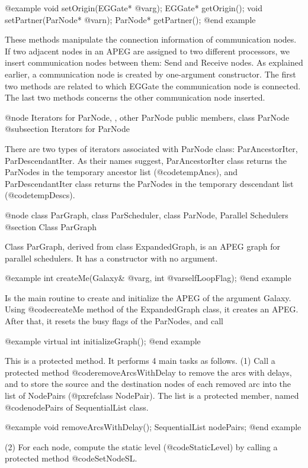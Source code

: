 @example
void setOrigin(EGGate* @var{g});
EGGate* getOrigin();
void setPartner(ParNode* @var{n});
ParNode* getPartner();
@end example

These methods manipulate the connection information of communication nodes.
If two adjacent nodes in an APEG are assigned to two different processors,
we insert communication nodes between them: Send and Receive nodes. As
explained earlier, a communication node is created by one-argument
constructor. The
first two methods are related to which EGGate the communication node is
connected. The last two methods concerns the other communication node
inserted.

@node Iterators for ParNode, , other ParNode public members, class ParNode
@subsection Iterators for ParNode

There are two types of iterators associated with ParNode class: 
ParAncestorIter, ParDescendantIter. As their names suggest, ParAncestorIter
class returns the ParNodes in the temporary ancestor list (@code{tempAncs}),
and ParDescendantIter class returns the ParNodes in the temporary
descendant list (@code{tempDescs}). 

@node class ParGraph, class ParScheduler, class ParNode, Parallel Schedulers
@section Class ParGraph

Class ParGraph, derived from class ExpandedGraph, is an APEG graph for
parallel schedulers. It has a constructor with no argument. 

@example
int createMe(Galaxy& @var{g}, int @var{selfLoopFlag});
@end example

Is the main routine to create and initialize the APEG of the
argument Galaxy. Using @code{createMe} method of the ExpandedGraph
class, it creates an APEG. After that, it resets the busy flags of
the ParNodes, and call

@example
virtual int initializeGraph();
@end example

This is a protected method. It performs 4 main tasks as follows.
(1) Call a protected method @code{removeArcsWithDelay} to remove 
the arcs with delays, and to store the source and the
destination nodes of each removed arc into the list of NodePairs
(@pxref{class NodePair}). The list is a protected member, named
@code{nodePairs} of SequentialList class.

@example
void removeArcsWithDelay();
SequentialList nodePairs;
@end example

(2) For each node, compute the static level (@code{StaticLevel}) by calling
a protected method @code{SetNodeSL}. 

